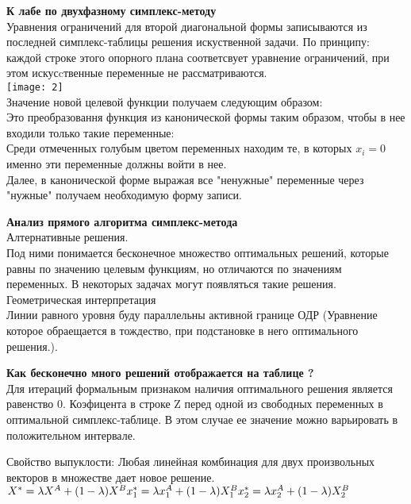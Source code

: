 \Large{ \textbf {К лабе по двухфазному симплекс-методу}}\\
Уравнения ограничений для второй диагональной формы записываются из последней симплекс-таблицы решения искуственной задачи.
По принципу: каждой строке этого опорного плана соответсвует уравнение ограничений, при этом искусcтвенные переменные не рассматриваются.\\
\texttt{[image: 2]}\\
Значение новой целевой функции получаем следующим образом: \\
Это преобразовання функция из канонической формы таким образом, чтобы в нее входили только такие переменные:\\
Среди отмеченных голубым цветом переменных находим те, в которых $x_i = 0$ именно эти переменные должны войти в нее.\\
Далее, в канонической форме выражая все "ненужные" переменные через "нужные"   получаем необходимую форму записи.\\

\newpage

\Large{ \textbf {Анализ прямого алгоритма симплекс-метода }}\\
Алтернативные решения.\\
Под ними понимается бесконечное множество оптимальных решений, которые равны по значению целевым функциям,
 но отличаются по значениям переменных. В некоторых задачах могут появляться такие решения.\\
Геометрическая интерпретация\\
Линии равного уровня буду параллельны активной границе ОДР
(Уравнение которое обраещается в тождество, при подстановке в него оптимального решения.).

\Large{ \textbf { Как бесконечно много решений отображается на таблице ?}}\\
Для итераций формальным признаком наличия оптимального решения является равенство 0.
Коэфицента в строке Z перед одной из свободных переменных в оптимальной симплекс-таблице.
В этом случае ее значение можно варьировать в положительном интервале.

Свойство выпуклости:
Любая линейная комбинация для двух произвольных векторов в множестве дает новое решение. \\
$
X^* = \lambda X^A + (1 - \lambda)X^B \\
x_1 ^ * = \lambda x_1 ^A + (1 - \lambda)X^B_1 \\
x_2 ^ * = \lambda x_2 ^A + (1 - \lambda)X^B_2 \\
$
